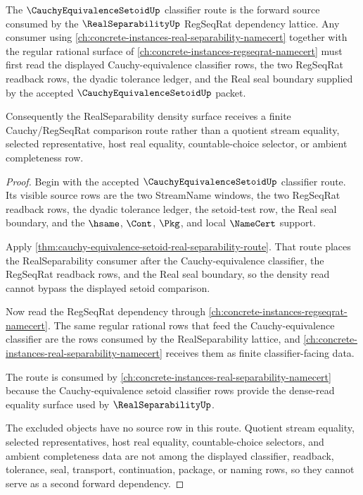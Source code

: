 \begin{theorem}
\label{thm:cauchy-equivalence-setoid-real-separability-forward-link}
The $\CauchyEquivalenceSetoidUp$ classifier route is the forward source consumed by the $\RealSeparabilityUp$ RegSeqRat dependency lattice. Any consumer using \autoref{ch:concrete-instances-real-separability-namecert} together with the regular rational surface of \autoref{ch:concrete-instances-regseqrat-namecert} must first read the displayed Cauchy-equivalence classifier rows, the two RegSeqRat readback rows, the dyadic tolerance ledger, and the Real seal boundary supplied by the accepted $\CauchyEquivalenceSetoidUp$ packet.

Consequently the RealSeparability density surface receives a finite Cauchy/RegSeqRat comparison route rather than a quotient stream equality, selected representative, host real equality, countable-choice selector, or ambient completeness row.
\end{theorem}
\begin{proof}
Begin with the accepted $\CauchyEquivalenceSetoidUp$ classifier route. Its visible source rows are the two StreamName windows, the two RegSeqRat readback rows, the dyadic tolerance ledger, the setoid-test row, the Real seal boundary, and the $\hsame$, $\Cont$, $\Pkg$, and local $\NameCert$ support.

Apply \autoref{thm:cauchy-equivalence-setoid-real-separability-route}. That route places the RealSeparability consumer after the Cauchy-equivalence classifier, the RegSeqRat readback rows, and the Real seal boundary, so the density read cannot bypass the displayed setoid comparison.

Now read the RegSeqRat dependency through \autoref{ch:concrete-instances-regseqrat-namecert}. The same regular rational rows that feed the Cauchy-equivalence classifier are the rows consumed by the RealSeparability lattice, and \autoref{ch:concrete-instances-real-separability-namecert} receives them as finite classifier-facing data.

The route is consumed by \autoref{ch:concrete-instances-real-separability-namecert} because the Cauchy-equivalence setoid classifier rows provide the dense-read equality surface used by $\RealSeparabilityUp$.

The excluded objects have no source row in this route. Quotient stream equality, selected representatives, host real equality, countable-choice selectors, and ambient completeness data are not among the displayed classifier, readback, tolerance, seal, transport, continuation, package, or naming rows, so they cannot serve as a second forward dependency.
\end{proof}
